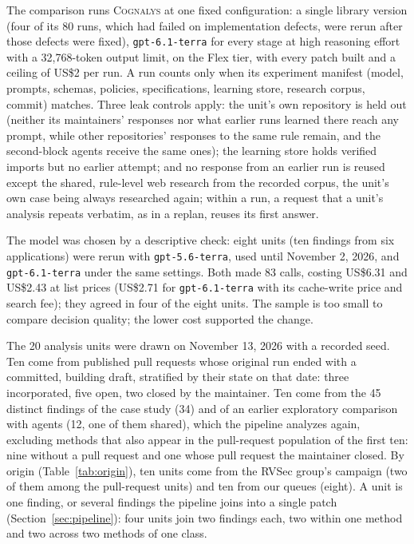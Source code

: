 \documentclass[conference]{IEEEtran}
\newcommand{\system}{\textsc{Cognalys}}
\begin{document}
The comparison runs {\system} at one fixed configuration: a single library
version (four of its 80 runs, which had failed on implementation
defects, were rerun after those defects were fixed), \texttt{gpt-6.1-terra} for every stage at high reasoning
effort with a 32,768-token output limit, on the Flex tier, with every patch
built and a ceiling of US\$2 per run. A run counts only when its experiment
manifest (model, prompts, schemas, policies, specifications, learning store,
research corpus, commit) matches. Three leak controls apply: the unit's own
repository is held out (neither its maintainers' responses nor what earlier
runs learned there reach any prompt, while other repositories' responses to
the same rule remain, and the second-block agents receive the same ones); the
learning store holds verified imports but no earlier attempt; and no response
from an earlier run is reused except the shared, rule-level web research from
the recorded corpus, the unit's own case being always researched again; within
a run, a request that a unit's analysis repeats verbatim, as in a replan,
reuses its first answer.

The model was chosen by a descriptive check: eight units (ten findings from
six applications) were rerun with \texttt{gpt-5.6-terra}, used until
November 2, 2026, and \texttt{gpt-6.1-terra}
under the same settings. Both made 83 calls, costing US\$6.31 and US\$2.43 at
list prices (US\$2.71 for \texttt{gpt-6.1-terra} with its cache-write price
and search fee); they agreed in four of the eight units. The sample is too small to compare decision quality;
the lower cost supported the change.

The 20 analysis units were drawn on November 13, 2026 with a recorded seed.
Ten come from published pull requests whose original run ended with a
committed, building draft, stratified by their state on that date: three incorporated, five
open, two closed by the maintainer. Ten come from the 45 distinct findings of the case
study (34) and of an earlier exploratory comparison with agents (12, one of
them shared), which the pipeline analyzes again, excluding methods that also
appear in the pull-request population of the first ten: nine without a
pull request and one whose pull request the maintainer closed. By origin
(Table~\ref{tab:origin}), ten units come from the RVSec group's campaign (two
of them among the pull-request units) and ten from our queues (eight). A unit is one finding, or
several findings the pipeline joins into a single patch
(Section~\ref{sec:pipeline}): four units join two findings each, two within one
method and two across two methods of one class.
\end{document}
